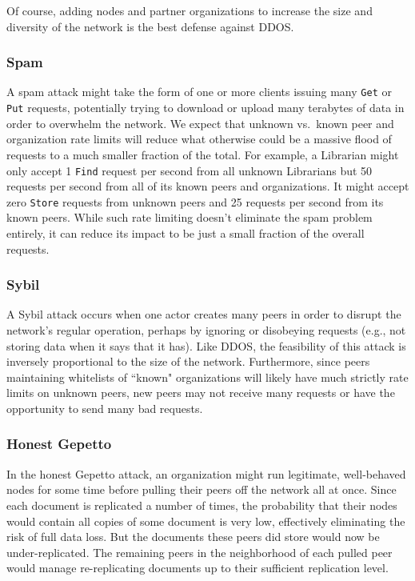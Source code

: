 \documentclass[10pt]{article}
\newcommand{\ttt}[1]{\texttt{#1}}
\def\Put{\ttt{Put}}
\def\Get{\ttt{Get}}
\begin{document}
Of course, adding nodes and partner organizations to increase the size and diversity of the network is the best defense against DDOS.

\subsubsection{Spam}
A spam attack might take the form of one or more clients issuing many \Get{} or \Put{} requests, potentially trying to download or upload many terabytes of data in order to overwhelm the network. We expect that unknown vs.\ known peer and organization rate limits will reduce what otherwise could be a massive flood of requests to a much smaller fraction of the total. For example, a Librarian might only accept 1 \ttt{Find} request per second from all unknown Librarians but 50 requests per second from all of its known peers and organizations. It might accept zero \ttt{Store} requests from unknown peers and 25 requests per second from its known peers. While such rate limiting doesn't eliminate the spam problem entirely, it can reduce its impact to be just a small fraction of the overall requests.

\subsubsection{Sybil}
A Sybil attack occurs when one actor creates many peers in order to disrupt the network's regular operation, perhaps by ignoring or disobeying requests (e.g., not storing data when it says that it has). Like DDOS, the feasibility of this attack is inversely proportional to the size of the network. Furthermore, since peers maintaining whitelists of ``known" organizations will likely have much strictly rate limits on unknown peers, new peers may not receive many requests or have the opportunity to send many bad requests.

\subsubsection{Honest Gepetto}
In the honest Gepetto \cite{storj} attack, an organization might run legitimate, well-behaved nodes for some time before pulling their peers off the network all at once. Since each document is replicated a number of times, the probability that their nodes would contain all copies of some document is very low, effectively eliminating the risk of full data loss. But the documents these peers did store would now be under-replicated. The remaining peers in the neighborhood of each pulled peer would manage re-replicating documents up to their sufficient replication level.
\end{document}
